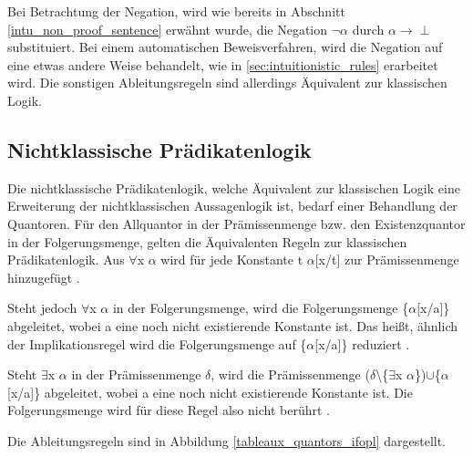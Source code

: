 Bei Betrachtung der Negation, wird wie bereits in Abschnitt \ref{intu_non_proof_sentence} erwähnt wurde, die Negation $\neg\alpha$ durch $\alpha\rightarrow\perp$ substituiert. Bei einem automatischen Beweisverfahren, wird die Negation auf eine etwas andere Weise behandelt, wie in \autoref{sec:intuitionistic_rules} erarbeitet wird. Die sonstigen Ableitungsregeln sind allerdings Äquivalent zur klassischen Logik.

\subsection{Nichtklassische Prädikatenlogik}
Die nichtklassische Prädikatenlogik, welche Äquivalent zur klassischen Logik eine Erweiterung der nichtklassischen Aussagenlogik ist, bedarf einer Behandlung der Quantoren. Für den Allquantor in der Prämissenmenge bzw. den Existenzquantor in der Folgerungsmenge, gelten die Äquivalenten Regeln zur klassischen Prädikatenlogik. Aus $\forall$x $\alpha$ wird für jede Konstante t $\alpha$[x/t] zur Prämissenmenge hinzugefügt \cite{DGHP99}.

Steht jedoch $\forall$x $\alpha$ in der Folgerungsmenge, wird die Folgerungsmenge \{$\alpha$[x/a]\} abgeleitet, wobei a eine noch nicht existierende Konstante ist. Das heißt, ähnlich der Implikationsregel wird die Folgerungsmenge auf \{$\alpha$[x/a]\} reduziert \cite{DGHP99}.

Steht $\exists$x $\alpha$ in der Prämissenmenge $\delta$, wird die Prämissenmenge ($\delta$\textbackslash \{$\exists$x $\alpha$\})$\cup$\{$\alpha$[x/a]\} abgeleitet, wobei a eine noch nicht existierende Konstante ist. Die Folgerungsmenge wird für diese Regel also nicht berührt \cite{DGHP99}.

Die Ableitungsregeln sind in Abbildung \ref{tableaux_quantors_ifopl} dargestellt.

